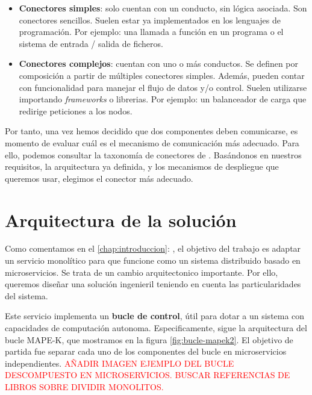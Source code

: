 \begin{itemize}
    \item \textbf{Conectores simples}: solo cuentan con un conducto, sin lógica asociada. Son conectores sencillos. Suelen estar ya implementados en los lenguajes de programación. Por ejemplo: una llamada a función en un programa o el sistema de entrada / salida de ficheros.

    \item \textbf{Conectores complejos}: cuentan con uno o más conductos. Se definen por composición a partir de múltiples conectores simples. Además, pueden contar con funcionalidad para manejar el flujo de datos y/o control. Suelen utilizarse importando \textit{frameworks} o librerias. Por ejemplo: un balanceador de carga que redirige peticiones a los nodos.
\end{itemize}

Por tanto, una vez hemos decidido que dos componentes deben comunicarse, es momento de evaluar cuál es el mecanismo de comunicación más adecuado. Para ello, podemos consultar la taxonomía de conectores de \cite{mehtaTaxonomySoftwareConnectors2000}. Basándonos en nuestros requisitos, la arquitectura ya definida, y los mecanismos de despliegue que queremos usar, elegimos el conector más adecuado.

\section{Arquitectura de la solución}

Como comentamos en el \autoref{chap:introduccion}: , el objetivo del trabajo es adaptar un servicio monolítico para que funcione como un sistema distribuido basado en microservicios. Se trata de un cambio arquitectonico importante. Por ello, queremos diseñar una solución ingenieril teniendo en cuenta las particularidades del sistema.

Este servicio implementa un \textbf{bucle de control}, útil para dotar a un sistema con capacidades de computación autonoma. Especificamente, sigue la arquitectura del bucle MAPE-K\cite{ArchitecturalBlueprintAutonomic2006,fonsServiciosAdaptivereadyPara2021}, que mostramos en la figura \ref{fig:bucle-mapek2}. El objetivo de partida fue separar cada uno de los componentes del bucle en microservicios independientes.  \textcolor{red}{AÑADIR IMAGEN EJEMPLO DEL BUCLE DESCOMPUESTO EN MICROSERVICIOS. BUSCAR REFERENCIAS DE LIBROS SOBRE DIVIDIR MONOLITOS.}

